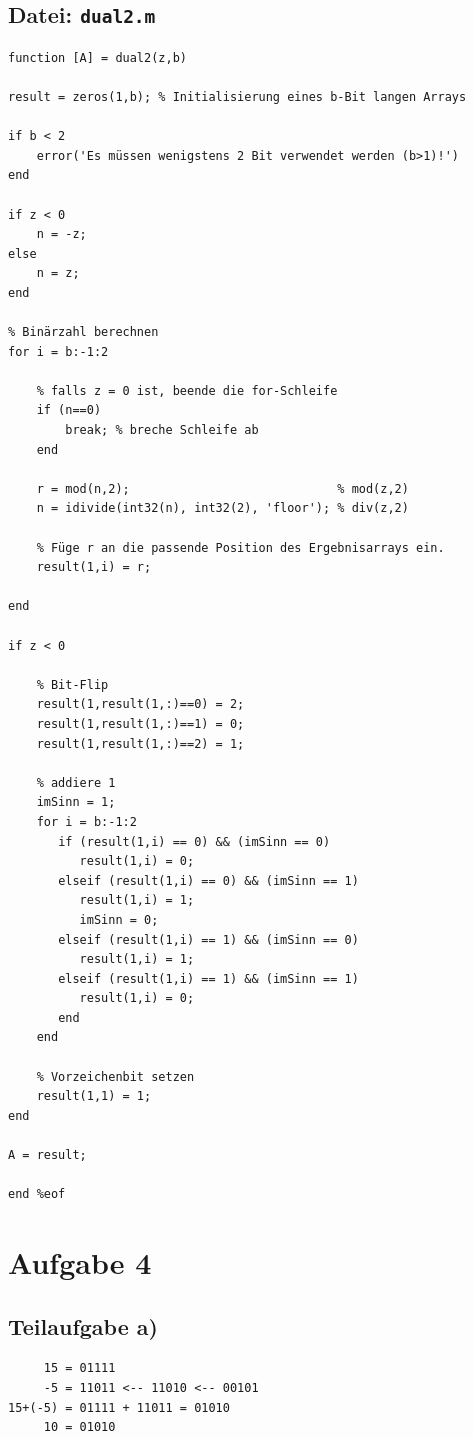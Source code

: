\documentclass{llncs}
\begin{document}
\subsection*{Datei: \texttt{dual2.m}}
\begin{verbatim}
function [A] = dual2(z,b)

result = zeros(1,b); % Initialisierung eines b-Bit langen Arrays

if b < 2
    error('Es müssen wenigstens 2 Bit verwendet werden (b>1)!')
end

if z < 0
    n = -z;
else
    n = z;
end

% Binärzahl berechnen
for i = b:-1:2

    % falls z = 0 ist, beende die for-Schleife
    if (n==0)
        break; % breche Schleife ab
    end
    
    r = mod(n,2);                             % mod(z,2)
    n = idivide(int32(n), int32(2), 'floor'); % div(z,2)
    
    % Füge r an die passende Position des Ergebnisarrays ein.
    result(1,i) = r; 
 
end

if z < 0

    % Bit-Flip
    result(1,result(1,:)==0) = 2;
    result(1,result(1,:)==1) = 0;
    result(1,result(1,:)==2) = 1;

    % addiere 1
    imSinn = 1;
    for i = b:-1:2
       if (result(1,i) == 0) && (imSinn == 0)
          result(1,i) = 0;
       elseif (result(1,i) == 0) && (imSinn == 1)
          result(1,i) = 1;
          imSinn = 0;
       elseif (result(1,i) == 1) && (imSinn == 0)
          result(1,i) = 1;
       elseif (result(1,i) == 1) && (imSinn == 1)
          result(1,i) = 0;
       end
    end
    
    % Vorzeichenbit setzen
    result(1,1) = 1;
end

A = result;

end %eof
\end{verbatim}
\newpage


\section*{Aufgabe 4}

\subsection*{Teilaufgabe a)}

\begin{verbatim}
     15 = 01111
     -5 = 11011 <-- 11010 <-- 00101
15+(-5) = 01111 + 11011 = 01010
     10 = 01010
\end{verbatim}
\end{document}

